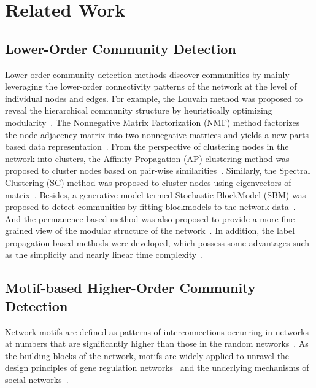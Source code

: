 \documentclass[sigconf]{acmart}
\begin{document}
\section{Related Work}
\label{sec:relatedwork}
\subsection{Lower-Order Community Detection}
\label{sec:lowerorderCD}
Lower-order community detection methods discover communities by mainly leveraging the lower-order connectivity patterns of the network at the level of individual nodes and edges. For example, the Louvain method was proposed to reveal the hierarchical community structure by heuristically optimizing modularity~\cite{Vincent2008Fast}. The Nonnegative Matrix Factorization (NMF) method factorizes the node adjacency matrix into two nonnegative matrices and yields a new parts-based data representation~\cite{cai2008non,cai2011graph}. From the perspective of clustering nodes in the network into clusters, the Affinity Propagation (AP) clustering method was proposed to cluster nodes based on pair-wise similarities~\cite{frey2007clustering}. Similarly, the Spectral Clustering (SC) method was proposed to cluster nodes using eigenvectors of matrix~\cite{ng2002spectral}.
Besides, a generative model termed Stochastic BlockModel (SBM) was proposed to detect communities by fitting blockmodels to the network data~\cite{karrer2011stochastic,peixoto2014efficient}. And the permanence based method was also proposed to provide a more fine-grained view of the modular structure of the network~\cite{chakraborty2014permanence}. In addition, the label propagation based methods were developed, which possess some advantages such as the simplicity and nearly linear time complexity~\cite{raghavan2007near}.




\subsection{Motif-based Higher-Order Community Detection}
\label{sec:higherorderCD}

Network motifs are defined as patterns of interconnections occurring in networks at numbers that are significantly higher than those in the random networks~\cite{milo2002network,benson2016higher}. As the building blocks of the network, motifs are widely applied to unravel the design principles of gene regulation networks~\cite{shen2002network} and the underlying mechanisms of social networks~\cite{holland1977dynamic,wasserman1994social}.
\end{document}
